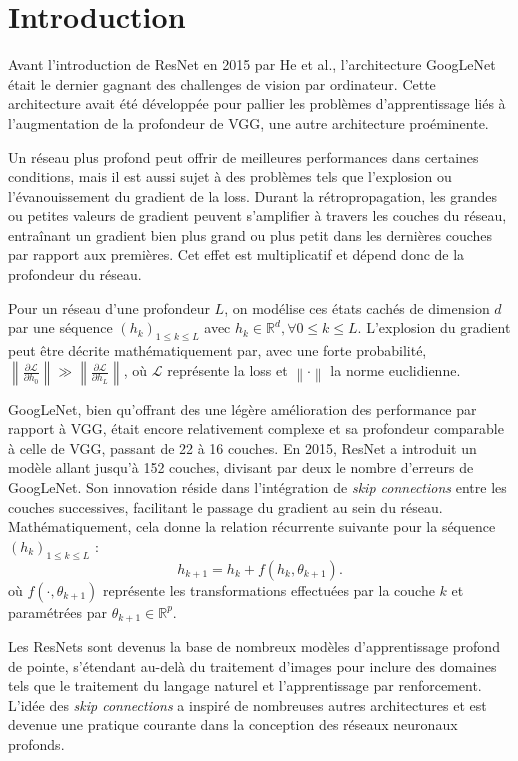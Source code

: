 \chapter{Introduction}
Avant l'introduction de ResNet en 2015 par He et al., l'architecture GoogLeNet était le dernier gagnant des challenges de vision par ordinateur. Cette architecture avait été développée pour pallier les problèmes d'apprentissage liés à l'augmentation de la profondeur de VGG, une autre architecture proéminente.

Un réseau plus profond peut offrir de meilleures performances dans certaines conditions, mais il est aussi sujet à des problèmes tels que l'explosion ou l'évanouissement du gradient de la loss. Durant la rétropropagation, les grandes ou petites valeurs de gradient peuvent s'amplifier à travers les couches du réseau, entraînant un gradient bien plus grand ou plus petit dans les dernières couches par rapport aux premières. Cet effet est multiplicatif et dépend donc de la profondeur du réseau.

Pour un réseau d'une profondeur $L$, on modélise ces états cachés de dimension $d$ par une séquence $(h_k)_{1 \leq k \leq L}$ avec $h_k \in \mathbb{R}^d, \forall 0 \leq k \leq L$. L'explosion du gradient peut être décrite mathématiquement par, avec une forte probabilité, $\left\| \frac{\partial \mathcal{L}}{\partial h_0} \right\| \gg \left\| \frac{\partial \mathcal{L}}{\partial h_L} \right\|$, où $\mathcal{L}$ représente la loss et $\left\| \cdot \right\|$ la norme euclidienne.

GoogLeNet, bien qu'offrant des une légère amélioration des performance par rapport à VGG, était encore relativement complexe et sa profondeur comparable à celle de VGG, passant de 22 à 16 couches. En 2015, ResNet a introduit un modèle allant jusqu'à 152 couches, divisant par deux le nombre d'erreurs de GoogLeNet. Son innovation réside dans l'intégration de \textit{skip connections} entre les couches successives, facilitant le passage du gradient au sein du réseau. Mathématiquement, cela donne la relation récurrente suivante pour la séquence $(h_k)_{1 \leq k \leq L}$ :
\[
    h_{k+1} = h_k + f(h_k, \theta_{k+1})
.\]
où $f(\cdot, \theta_{k+1})$ représente les transformations effectuées par la couche $k$ et paramétrées par $\theta_{k+1} \in \mathbb{R}^p$.

Les ResNets sont devenus la base de nombreux modèles d'apprentissage profond de pointe, s'étendant au-delà du traitement d'images pour inclure des domaines tels que le traitement du langage naturel et l'apprentissage par renforcement. L'idée des \textit{skip connections} a inspiré de nombreuses autres architectures et est devenue une pratique courante dans la conception des réseaux neuronaux profonds.

